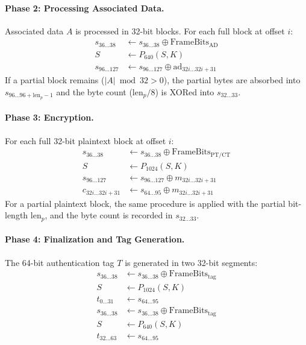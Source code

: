 \documentclass[11pt,a4paper]{article}
\newcommand{\xor}{\oplus}
\begin{document}
\paragraph{Phase 2: Processing Associated Data.}
Associated data $A$ is processed in 32-bit blocks. For each full block at offset $i$:
\begin{align}
s_{36\ldots 38} &\leftarrow s_{36\ldots 38} \xor \text{FrameBits}_{\text{AD}} \nonumber\\
S &\leftarrow P_{640}(S, K) \nonumber\\
s_{96\ldots 127} &\leftarrow s_{96\ldots 127} \xor \text{ad}_{32i\ldots 32i+31}
\label{eq:tj_ad_full}
\end{align}
If a partial block remains ($|A| \bmod 32 > 0$), the partial bytes are absorbed into $s_{96\ldots 96+\text{len}_p-1}$ and the byte count ($\text{len}_p / 8$) is XORed into $s_{32\ldots 33}$.

\paragraph{Phase 3: Encryption.}
For each full 32-bit plaintext block at offset $i$:
\begin{align}
s_{36\ldots 38} &\leftarrow s_{36\ldots 38} \xor \text{FrameBits}_{\text{PT/CT}} \nonumber\\
S &\leftarrow P_{1024}(S, K) \nonumber\\
s_{96\ldots 127} &\leftarrow s_{96\ldots 127} \xor m_{32i\ldots 32i+31} \nonumber\\
c_{32i\ldots 32i+31} &\leftarrow s_{64\ldots 95} \xor m_{32i\ldots 32i+31}
\label{eq:tj_enc_full}
\end{align}
For a partial plaintext block, the same procedure is applied with the partial bit-length $\text{len}_p$, and the byte count is recorded in $s_{32\ldots 33}$.

\paragraph{Phase 4: Finalization and Tag Generation.}
The 64-bit authentication tag $T$ is generated in two 32-bit segments:
\begin{align}
s_{36\ldots 38} &\leftarrow s_{36\ldots 38} \xor \text{FrameBits}_{\text{tag}} \nonumber\\
S &\leftarrow P_{1024}(S, K) \nonumber\\
t_{0\ldots 31}   &\leftarrow s_{64\ldots 95} \nonumber\\
s_{36\ldots 38} &\leftarrow s_{36\ldots 38} \xor \text{FrameBits}_{\text{tag}} \nonumber\\
S &\leftarrow P_{640}(S, K) \nonumber\\
t_{32\ldots 63}  &\leftarrow s_{64\ldots 95}
\label{eq:tj_tag}
\end{align}
\end{document}

